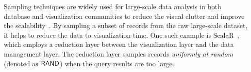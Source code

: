


Sampling techniques are widely used for large-scale data analysis in both database and visualization communities to reduce the visual clutter and improve the scalability~\cite{qin2020making,DBLP:conf/sigmod/DingHCC016,DBLP:journals/pvldb/KimBPIMR15,park2016visualization}. By sampling a subset of records from the raw large-scale dataset, it helps to reduce the data to visualization time. One such example is ScalaR~\cite{battle2013dynamic}, which employs a reduction layer between the visualization layer and the data management layer. The reduction layer samples records \textit{uniformly at random} (denoted as $\mathsf{RAND}$) when the query results are too large. 

